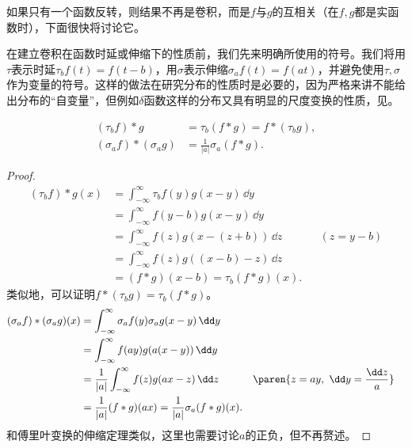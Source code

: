 如果只有一个函数反转，则结果不再是卷积，而是$f$与$g$的互相关（在$f,g$都是实函数时），下面很快将讨论它。

在建立卷积在函数时延或伸缩下的性质前，我们先来明确所使用的符号。我们将用$\tau$表示时延$\tau_b f(t)=f(t-b)$，用$\sigma$表示伸缩$\sigma_a f(t)=f(at)$，并避免使用$\tau,\sigma$作为变量的符号。这样的做法在研究分布的性质时是必要的，因为严格来讲不能给出分布的“自变量”，但例如$\delta$函数这样的分布又具有明显的尺度变换的性质，见。

\begin{proposition}
    \label{prop:conv_signal_shift}
    \begin{align}
        (\tau_b f)*g&=\tau_b (f*g)=f*(\tau_b g), \\
        (\sigma_a f)*(\sigma_a g)&=\frac{1}{|a|}\sigma_a(f*g).
    \end{align}
\end{proposition}
\begin{proof}
    \begin{align}
        (\tau_b f)*g(x) & =\int_{-\infty}^{\infty}\tau_b f(y)g(x-y)\,\dd y\nonumber           \\
                        & =\int_{-\infty}^{\infty}f(y-b)g(x-y)\,\dd y\nonumber                \\
                        & =\int_{-\infty}^{\infty}f(z)g(x-(z+b))\,\dd z    && (z=y-b)\nonumber \\
                        & =\int_{-\infty}^{\infty}f(z)g((x-b)-z)\,\dd z\nonumber              \\
                        & =(f*g)(x-b)=\tau_b (f*g)(x).
    \end{align}
    类似地，可以证明$f*(\tau_b g)=\tau_b (f*g)$。
    \begin{align}
        (\sigma_a f)*(\sigma_a g)(x) & =\int_{-\infty}^{\infty}\sigma_a f(y)\sigma_a g(x-y)\,\dd y\nonumber                                     \\
                                     & =\int_{-\infty}^{\infty}f(ay)g(a(x-y))\,\dd y\nonumber                                                   \\
                                     & =\frac{1}{|a|}\int_{-\infty}^{\infty}f(z)g(a x - z)\,\dd z  && \paren{z=ay,\ \dd y=\frac{\dd z}{a}}\nonumber \\
                                     & =\frac{1}{|a|}(f*g)(a x)=\frac{1}{|a|}\sigma_a(f*g)(x).
    \end{align}
    和傅里叶变换的伸缩定理类似，这里也需要讨论$a$的正负，但不再赘述。
\end{proof}

